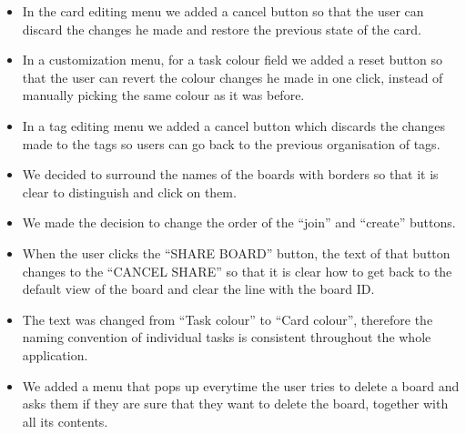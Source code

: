 \begin{itemize}

    \item{In the card editing menu we added a cancel button so that the user can discard the changes he made and restore the previous state of the card.}

    \item{In a customization menu, for a task colour field we added a reset button so that the user can revert the colour changes he made in one click, instead of manually picking the same colour as it was before.}

    \item{In a tag editing menu we added a cancel button which discards the changes made to the tags so users can go back to the previous organisation of tags.}

    \item{We decided to surround the names of the boards with borders so that it is clear to distinguish and click on them.}

    \item{We made the decision to change the order of the “join” and “create” buttons.}

    \item{When the user clicks the “SHARE BOARD” button, the text of that button changes to the “CANCEL SHARE” so that it is clear how to get back to the default view of the board and clear the line with the board ID.}

    \item{The text was changed from “Task colour” to “Card colour”, therefore the naming convention of individual tasks is consistent throughout the whole application.}

    \item{We added a menu that pops up everytime the user tries to delete a board and asks them if they are sure that they want to delete the board, together with all its contents.}

\end{itemize}
